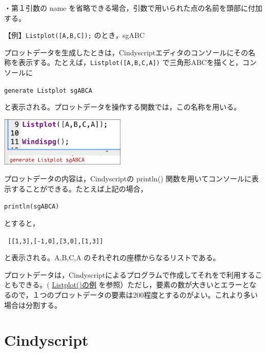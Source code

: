 \documentclass[papersize,a4paper,12pt,uplatex]{jsarticle}
\begin{document}
・第１引数の name を省略できる場合，引数で用いられた点の名前を頭部に付加する。

\hspace{10mm} 【例】\verb|Listplot([A,B,C]);| のとき，sgABC


\vspace{\baselineskip}
プロットデータを生成したときは，Cindyscriptエディタのコンソールにその名称を表示する。たとえば，\verb|Listplot([A,B,C,A])| で三角形ABCを描くと，コンソールに

\hspace{10mm}  \verb|generate Listplot sgABCA|

と表示される。プロットデータを操作する関数では，この名称を用いる。

\begin{center}\includegraphics[bb=0.00 0.00 298.02 115.01,width=6cm]{Fig/pdtoconsole.pdf} \end{center}

プロットデータの内容は，Cindyscriptの println() 関数を用いてコンソールに表示することができる。たとえば上記の場合，

\hspace{10mm}  \verb|println(sgABCA)|
        
とすると，

\hspace{10mm}  \verb| [[1,3],[-1,0],[3,0],[1,3]] |

と表示される。A,B,C,A のそれぞれの座標からなるリストである。

プロットデータは，Cindyscriptによるプログラムで作成してそれを\ketcindy で利用することもできる。( \hyperlink{listplot}{Listplot()の例}  を参照）ただし，要素の数が大きいとエラーとなるので，１つのプロットデータの要素は200程度とするのがよい。これより多い場合は分割する。

\newpage

\section{Cindyscript}
\end{document}
